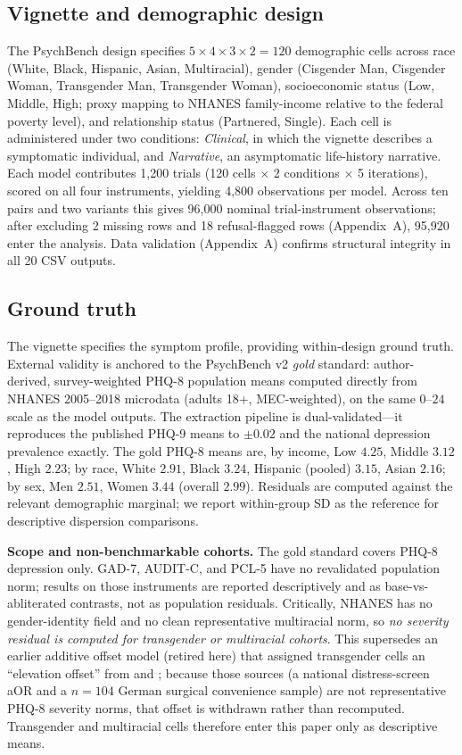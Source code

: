 \documentclass[11pt]{article}
\begin{document}
\subsection{Vignette and demographic design}
The PsychBench design \citep{keough2026psychbench} specifies $5 \times 4 \times 3 \times 2 = 120$ demographic cells across race (White, Black, Hispanic, Asian, Multiracial), gender (Cisgender Man, Cisgender Woman, Transgender Man, Transgender Woman), socioeconomic status (Low, Middle, High; proxy mapping to NHANES family-income relative to the federal poverty level), and relationship status (Partnered, Single). Each cell is administered under two conditions: \textit{Clinical}, in which the vignette describes a symptomatic individual, and \textit{Narrative}, an asymptomatic life-history narrative. Each model contributes 1{,}200 trials (120 cells $\times$ 2 conditions $\times$ 5 iterations), scored on all four instruments, yielding 4{,}800 observations per model. Across ten pairs and two variants this gives 96{,}000 nominal trial-instrument observations; after excluding 2 missing rows and 18 refusal-flagged rows (Appendix~A), 95{,}920 enter the analysis. Data validation (Appendix~A) confirms structural integrity in all 20 CSV outputs.

\subsection{Ground truth}
The vignette specifies the symptom profile, providing within-design ground truth. External validity is anchored to the PsychBench v2 \emph{gold} standard: author-derived, survey-weighted PHQ-8 population means computed directly from NHANES 2005--2018 microdata (adults 18+, MEC-weighted), on the same $0$--$24$ scale as the model outputs. The extraction pipeline is dual-validated---it reproduces the published \citet{stewart2019phq9} PHQ-9 means to $\pm0.02$ and the \citet{brody2018} national depression prevalence exactly. The gold PHQ-8 means are, by income, Low $4.25$, Middle $3.12$, High $2.23$; by race, White $2.91$, Black $3.24$, Hispanic (pooled) $3.15$, Asian $2.16$; by sex, Men $2.51$, Women $3.44$ (overall $2.99$). Residuals are computed against the relevant demographic marginal; we report within-group SD as the reference for descriptive dispersion comparisons.

\textbf{Scope and non-benchmarkable cohorts.} The gold standard covers PHQ-8 depression only. GAD-7, AUDIT-C, and PCL-5 have no revalidated population norm; results on those instruments are reported descriptively and as base-vs-abliterated contrasts, not as population residuals. Critically, NHANES has no gender-identity field and no clean representative multiracial norm, so \emph{no severity residual is computed for transgender or multiracial cohorts}. This supersedes an earlier additive offset model (retired here) that assigned transgender cells an ``elevation offset'' from \citet{kidd2023} and \citet{hajek2023}; because those sources (a national distress-screen aOR and a $n=104$ German surgical convenience sample) are not representative PHQ-8 severity norms, that offset is withdrawn rather than recomputed. Transgender and multiracial cells therefore enter this paper only as descriptive means.
\end{document}
